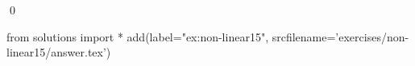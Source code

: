 
\begin{ex} 
  \label{ex:non-linear15}
  
  \qed
\end{ex} 
\begin{python0}
from solutions import *
add(label="ex:non-linear15",
    srcfilename='exercises/non-linear15/answer.tex') 
\end{python0}
